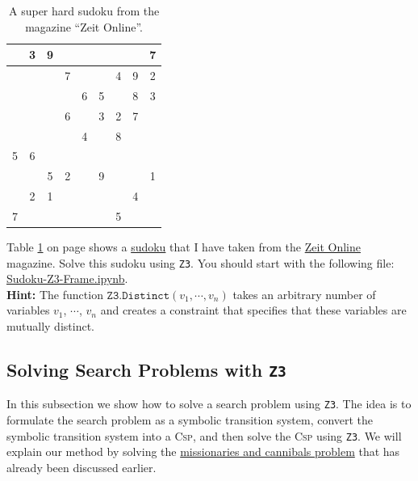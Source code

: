 \begin{table}[h]
  \centering
  \begin{tabular}{||c|c|c||c|c|c||c|c|c||}
    \hline
    \hline
      & 3 & 9 &   &   &   &   &   & 7 \\
    \hline
      &   &   & 7 &   &   & 4 & 9 & 2 \\
    \hline
      &   &   &   & 6 & 5 &   & 8 & 3 \\
    \hline
    \hline
      &   &   & 6 &   & 3 & 2 & 7 &   \\
    \hline
      &   &   &   & 4 &   & 8 &   &   \\
    \hline
    5 & 6 &   &   &   &   &   &   &   \\
    \hline
    \hline
      &   & 5 & 2 &   & 9 &   &   & 1 \\
    \hline
      & 2 & 1 &   &   &   &   & 4 &   \\
    \hline
    7 &   &   &   &   &   & 5 &   &   \\
    \hline
    \hline
  \end{tabular}
  \caption{A super hard sudoku from the magazine ``Zeit Online''.}
  \label{tab:sudoku}
\end{table}


\exerciseEng
{}
Table \ref{tab:sudoku} on page \pageref{tab:sudoku} shows a \href{https://en.wikipedia.org/wiki/Sudoku}{sudoku}
that I have taken from the
\href{http://sudoku.zeit.de/cgi-bin/sudoku/sudoku_kd_app_2016.pl?action=level&kd_nr=24091123601092&year=2018&month=03&day=23&level=-c+5}{Zeit Online}
magazine.
Solve this sudoku using \texttt{Z3}.  You should start with the following file:
\\[0.2cm]
\hspace*{1.3cm}
\href{https://github.com/karlstroetmann/Logic/blob/master/TypeScript/Chapter-5/Sudoku-Z3-Frame.ipynb}{Sudoku-Z3-Frame.ipynb}.
\\[0.2cm]
\textbf{Hint:} The function $\texttt{Z3.Distinct}(v_1, \cdots, v_n)$ takes an arbitrary number of variables
$v_1$, $\cdots$, $v_n$ and creates a constraint that specifies that these variables are mutually distinct.
\eox

\subsection{Solving Search Problems with \texttt{Z3}}
In this subsection we show how to solve a search problem using \texttt{Z3}.  The idea is to formulate the
search problem as a symbolic transition system, convert the symbolic transition system into a \textsc{Csp}, and
then solve the \textsc{Csp} using \texttt{Z3}.
We will explain our method by solving the
\href{https://en.wikipedia.org/wiki/Missionaries_and_cannibals_problem}{missionaries and cannibals problem}
that has already been discussed earlier.  

